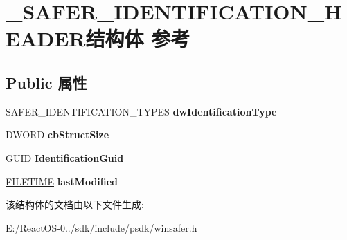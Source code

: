 \hypertarget{struct___s_a_f_e_r___i_d_e_n_t_i_f_i_c_a_t_i_o_n___h_e_a_d_e_r}{}\section{\+\_\+\+S\+A\+F\+E\+R\+\_\+\+I\+D\+E\+N\+T\+I\+F\+I\+C\+A\+T\+I\+O\+N\+\_\+\+H\+E\+A\+D\+E\+R结构体 参考}
\label{struct___s_a_f_e_r___i_d_e_n_t_i_f_i_c_a_t_i_o_n___h_e_a_d_e_r}
\subsection*{Public 属性}
\begin{DoxyCompactItemize}
\item 
\mbox{\label{struct___s_a_f_e_r___i_d_e_n_t_i_f_i_c_a_t_i_o_n___h_e_a_d_e_r_a15da472beb0a65112b99cd677782c5f6}} 
S\+A\+F\+E\+R\+\_\+\+I\+D\+E\+N\+T\+I\+F\+I\+C\+A\+T\+I\+O\+N\+\_\+\+T\+Y\+P\+ES {\bfseries dw\+Identification\+Type}
\item 
\mbox{\label{struct___s_a_f_e_r___i_d_e_n_t_i_f_i_c_a_t_i_o_n___h_e_a_d_e_r_a725dd7c138c0624aeeab0545efa39083}} 
D\+W\+O\+RD {\bfseries cb\+Struct\+Size}
\item 
\mbox{\label{struct___s_a_f_e_r___i_d_e_n_t_i_f_i_c_a_t_i_o_n___h_e_a_d_e_r_a419bc2145e6c392920fc75440991f4d7}} 
\hyperlink{interface_g_u_i_d}{G\+U\+ID} {\bfseries Identification\+Guid}
\item 
\mbox{\label{struct___s_a_f_e_r___i_d_e_n_t_i_f_i_c_a_t_i_o_n___h_e_a_d_e_r_abc5703e3c6f86ea14bf6d87f7da8080d}} 
\hyperlink{struct___f_i_l_e_t_i_m_e}{F\+I\+L\+E\+T\+I\+ME} {\bfseries last\+Modified}
\end{DoxyCompactItemize}


该结构体的文档由以下文件生成\+:\begin{DoxyCompactItemize}
\item 
E\+:/\+React\+O\+S-\/0../sdk/include/psdk/winsafer.\+h\end{DoxyCompactItemize}
